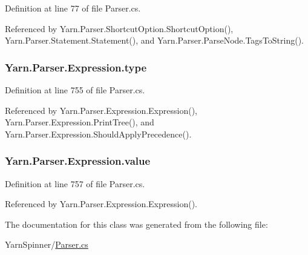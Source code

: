 Definition at line 77 of file Parser.\-cs.



Referenced by Yarn.\-Parser.\-Shortcut\-Option.\-Shortcut\-Option(), Yarn.\-Parser.\-Statement.\-Statement(), and Yarn.\-Parser.\-Parse\-Node.\-Tags\-To\-String().

\hypertarget{a00104_ad55c92df835006328bc2a79a8f91efb9}{
\subsubsection[{type}]{ Yarn.\-Parser.\-Expression.\-type\hspace{0.3cm}{\ttfamily [package]}}}\label{a00104_ad55c92df835006328bc2a79a8f91efb9}


Definition at line 755 of file Parser.\-cs.



Referenced by Yarn.\-Parser.\-Expression.\-Expression(), Yarn.\-Parser.\-Expression.\-Print\-Tree(), and Yarn.\-Parser.\-Expression.\-Should\-Apply\-Precedence().

\hypertarget{a00104_a569e516782891544c334ff8131b23108}{
\subsubsection[{value}]{ Yarn.\-Parser.\-Expression.\-value\hspace{0.3cm}{\ttfamily [package]}}}\label{a00104_a569e516782891544c334ff8131b23108}


Definition at line 757 of file Parser.\-cs.



Referenced by Yarn.\-Parser.\-Expression.\-Expression().



The documentation for this class was generated from the following file\-:\begin{DoxyCompactItemize}
\item 
Yarn\-Spinner/\hyperlink{a00313}{Parser.\-cs}\end{DoxyCompactItemize}

